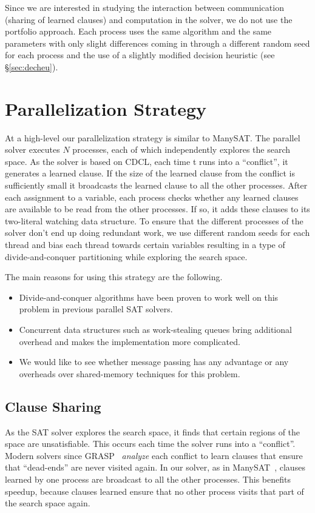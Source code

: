 \documentclass[letterpaper, compsoc, conference]{IEEEtran}
\begin{document}
Since we are interested in studying the interaction between communication
(sharing of learned clauses) and computation in the solver, we do not use the
portfolio approach. Each process uses the same algorithm and the same
parameters with only slight differences coming in through a different random
seed for each process and the use of a slightly modified decision heuristic
(see \S\ref{sec:decheu}).

\section{Parallelization Strategy}
\label{sec:strategy}

At a high-level our parallelization strategy is similar to ManySAT. The
parallel solver executes $N$ processes, each of which independently explores
the search space. As the solver is based on CDCL, each time t runs into a
``conflict'', it generates a learned clause. If the size of the learned clause
from the conflict is sufficiently small it broadcasts the learned clause to all
the other processes.  After each assignment to a variable, each process checks
whether any learned clauses are available to be read from the other processes.
If so, it adds these clauses to its two-literal watching data structure. To
ensure that the different processes of the solver don't end up doing redundant
work, we use different random seeds for each thread and bias each thread
towards certain variables resulting in a type of divide-and-conquer
partitioning while exploring the search space.

The main reasons for using this strategy are the following.
\begin{itemize}
\item Divide-and-conquer algorithms have been proven to work well on this
problem in previous parallel SAT solvers.
\item Concurrent data structures such as work-stealing queues bring additional
overhead and makes the implementation more complicated.
\item We would like to see whether message passing has any advantage or
any overheads over shared-memory techniques for this problem.
\end{itemize} 

\subsection{Clause Sharing}

As the SAT solver explores the search space, it finds that certain regions of
the space are unsatisfiable. This occurs each time the solver runs into a
``conflict''. Modern solvers since GRASP~\cite{Silva1997GRASP} \emph{analyze} each
conflict to learn clauses that ensure that ``dead-ends'' are never visited
again. In our solver, as in ManySAT~\cite{ManySAT}, clauses learned by one
process are broadcast to all the other processes. This benefits speedup,
because clauses learned ensure that no other process visits that part 
of the search space again.
\end{document}
